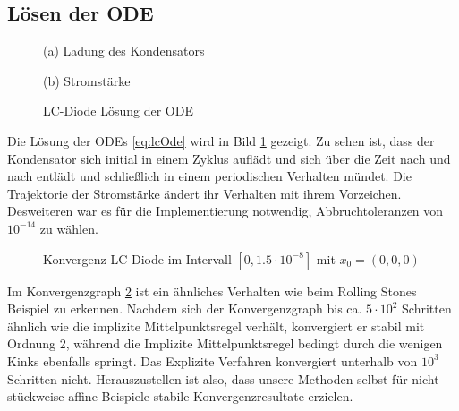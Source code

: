 \subsection{Lösen der ODE}
\begin{figure}[H]
\footnotesize 
\centering
\begin{minipage}[b]{0.49\linewidth}

\caption*{(a) Ladung des Kondensators}
\end{minipage}
\begin{minipage}[b]{0.49\linewidth}

\caption*{(b) Stromstärke}
\end{minipage}
\caption{LC-Diode Lösung der ODE}
\label{fig:lc_solution}
\end{figure}
Die Lösung der ODEs \eqref{eq:lcOde} wird in Bild \ref{fig:lc_solution} gezeigt. Zu sehen ist, dass der Kondensator sich initial in einem Zyklus auflädt und sich über die Zeit nach und nach entlädt und schließlich in einem periodischen Verhalten mündet. Die Trajektorie der Stromstärke ändert ihr Verhalten mit ihrem Vorzeichen. Desweiteren war es für die Implementierung notwendig, Abbruchtoleranzen von $10^{-14}$ zu wählen. 

\begin{figure}
\centering

\caption{Konvergenz LC Diode im Intervall $[0,1.5\cdot 10^{-8}]$ mit $x_0=(0,0,0)$}
\label{fig:lcConvergence}
\end{figure}
Im Konvergenzgraph \ref{fig:lcConvergence} ist ein ähnliches Verhalten wie beim Rolling Stones Beispiel zu erkennen. Nachdem sich der Konvergenzgraph bis ca. $5\cdot 10^2$ Schritten ähnlich wie die implizite Mittelpunktsregel verhält, konvergiert er stabil mit Ordnung 2, während die Implizite Mittelpunktsregel bedingt durch die wenigen Kinks ebenfalls springt. Das Explizite Verfahren konvergiert unterhalb von $10^3$ Schritten nicht. 
Herauszustellen ist also, dass unsere Methoden selbst für nicht stückweise affine Beispiele stabile Konvergenzresultate erzielen.

